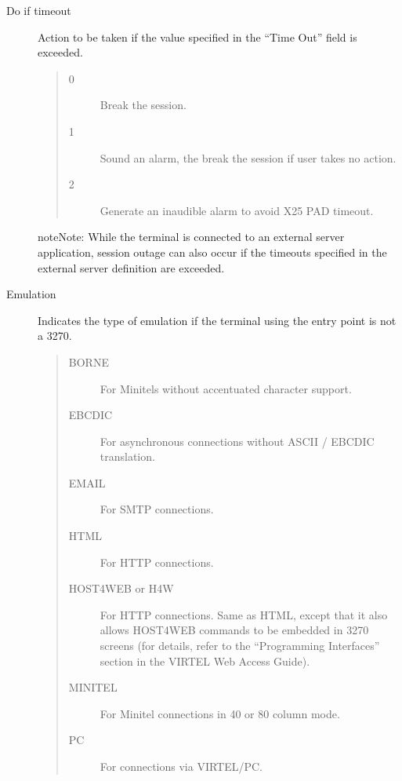\documentclass[letterpaper,10pt,english]{sphinxmanual}
\begin{document}
\begin{description}
\item[{Do if timeout}] \leavevmode
Action to be taken if the value specified in the “Time Out” field is exceeded.
\begin{quote}
\begin{description}
\item[{0}] \leavevmode
Break the session.

\item[{1}] \leavevmode
Sound an alarm, the break the session if user takes no action.

\item[{2}] \leavevmode
Generate an inaudible alarm to avoid X25 PAD timeout.

\end{description}
\end{quote}

\begin{sphinxadmonition}{note}{Note:}
While the terminal is connected to an external server application, session outage can also occur if the timeouts specified in the external server definition are exceeded.
\end{sphinxadmonition}

\item[{Emulation}] \leavevmode
Indicates the type of emulation if the terminal using the entry point is not a 3270.
\begin{quote}
\begin{description}
\item[{BORNE}] \leavevmode
For Minitels without accentuated character support.

\item[{EBCDIC}] \leavevmode
For asynchronous connections without ASCII / EBCDIC translation.

\item[{EMAIL}] \leavevmode
For SMTP connections.

\item[{HTML}] \leavevmode
For HTTP connections.

\item[{HOST4WEB or H4W}] \leavevmode
For HTTP connections. Same as HTML, except that it also allows HOST4WEB commands to be embedded in 3270 screens (for details, refer to the “Programming Interfaces” section in the VIRTEL Web Access Guide).

\item[{MINITEL}] \leavevmode
For Minitel connections in 40 or 80 column mode.

\item[{PC}] \leavevmode
For connections via VIRTEL/PC.


\end{description}
\end{quote}
\end{description}
\end{document}
